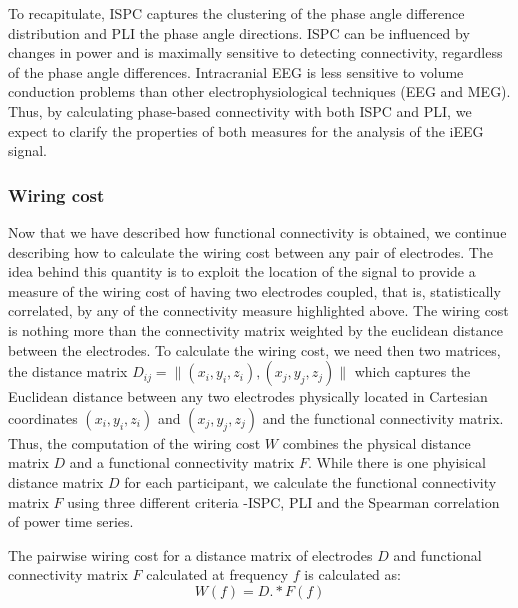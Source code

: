 \documentclass[11pt, onecolumn]{article}
\begin{document}
To recapitulate, ISPC captures the clustering of the phase angle difference distribution and PLI the phase angle directions. ISPC can be influenced by changes in power and is maximally sensitive to detecting connectivity, regardless of the phase angle differences. 
Intracranial EEG is less sensitive to volume conduction problems than other electrophysiological techniques (EEG and MEG). Thus, by calculating phase-based connectivity with both ISPC and PLI, we expect to clarify the properties of both measures for the analysis of the iEEG signal.


\subsubsection{Wiring cost}
Now that we have described how functional connectivity is obtained, we continue describing how to calculate the wiring cost between any pair of electrodes. The idea behind this quantity is to exploit the location of the signal to provide a measure of the wiring cost of having two electrodes coupled, that is, statistically correlated, by any of the connectivity measure highlighted above. The wiring cost is nothing more than the connectivity matrix weighted by the euclidean distance between the electrodes.
To calculate the wiring cost, we need then two matrices, the distance matrix   
$D_{ij} = \Big\|(x_i,y_i,z_i),(x_j,y_j,z_j) \Big\|$ 
which captures the Euclidean distance between any two electrodes physically located in Cartesian coordinates $(x_i,y_i,z_i)$ and $(x_j,y_j,z_j)$ and the functional connectivity matrix. Thus, the computation of the wiring cost $W$ combines the physical distance matrix $D$ and a functional connectivity matrix $F$. While there is one phyisical distance matrix $D$ for each participant, we calculate the functional connectivity matrix $F$ using three different criteria -ISPC, PLI and the Spearman correlation of power time series.

The pairwise wiring cost for a distance matrix of electrodes $D$ and functional connectivity matrix $F$ calculated at frequency $f$ is calculated as:
\begin{equation}
W(f) = D.*F(f)
\label{eq:pairwc}
\end{equation} 
\end{document}
